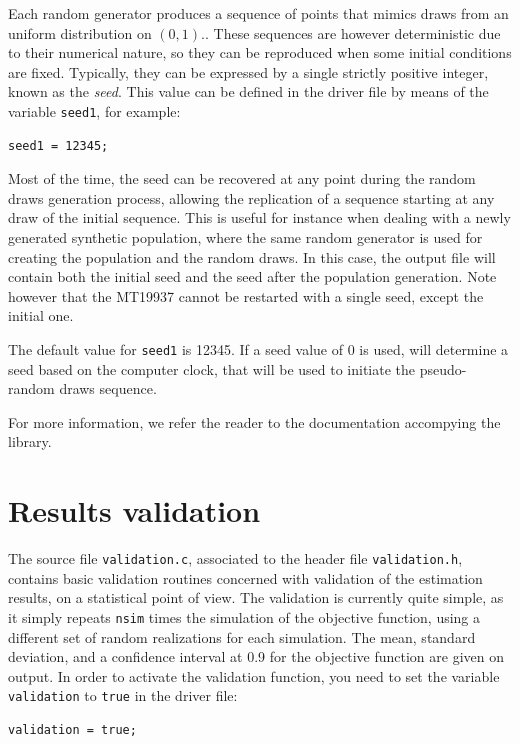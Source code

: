 Each random generator produces a sequence of points that mimics draws
from an uniform distribution on $(0,1)$.. These sequences are however
deterministic due to their numerical nature, so they can be
reproduced when some initial conditions are fixed. Typically, they can
be expressed by a single strictly positive integer, known as the {\em
  seed}. This value can be defined in the driver file by means of the
variable \verb|seed1|, for example:
\begin{verbatim}
seed1 = 12345;
\end{verbatim}
Most of the time, the seed can be recovered at any point during the
random draws generation process, allowing the replication of a
sequence starting at any draw of the initial sequence. This is useful
for instance when dealing with a newly generated synthetic population, where the same random generator is used for creating the population and the random draws.
In this
case, the output file will contain both the initial seed and the seed
after the population generation. Note however that the MT19937 cannot
be restarted with a single seed, except the initial one.

The default value for \verb|seed1| is 12345.
If a seed value of 0 is used, \amlet{} will determine a seed based on the computer clock, that will be used to initiate the pseudo-random draws sequence.

For more information, we refer the reader to the documentation
accompying the \oratio{} library.

\section{Results validation}

The source file \verb|validation.c|, associated to the header file
\verb|validation.h|, contains basic validation routines concerned with
validation of the estimation results, on a statistical point of view.
The validation is currently quite simple, as it simply repeats
\verb|nsim| times the simulation of the objective function, using
a different set of random realizations for each simulation.
The mean, standard deviation, and a confidence interval at 0.9 for the
objective function are given on output.
In order to activate the validation function, you need to set the
variable \verb|validation| to \verb|true| in the driver file:
\begin{verbatim}
validation = true;
\end{verbatim}
